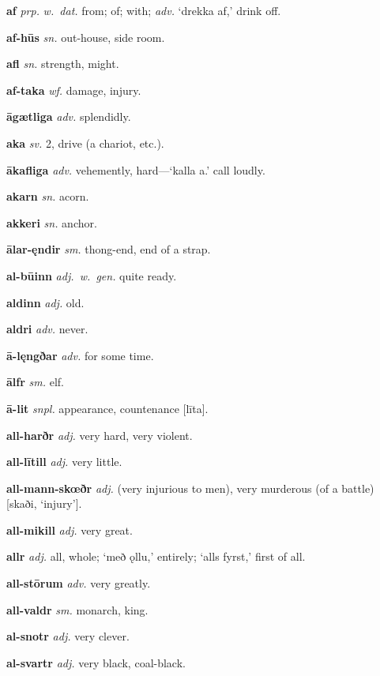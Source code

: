 \documentclass[12pt,letterpaper]{book}
\begin{document}
\noindent
\textbf{af} \textit{prp.} \textit{w.\ dat.} from; of; with; \textit{adv.} `drekka af,' drink off.

\noindent
\textbf{af-hūs} \textit{sn.} out-house, side room.

\noindent
\textbf{afl} \textit{sn.} strength, might.

\noindent
\textbf{af-taka} \textit{wf.} damage, injury.

\noindent
\textbf{āgætliga} \textit{adv.} splendidly.

\noindent
\textbf{aka} \textit{sv.} 2, drive (a chariot, etc.).

\noindent
\textbf{ākafliga} \textit{adv.} vehemently, hard---`kalla a.' call loudly.

\noindent
\textbf{akarn} \textit{sn.} acorn.

\noindent
\textbf{akkeri} \textit{sn.} anchor.

\noindent
\textbf{ālar-ęndir} \textit{sm.} thong-end, end of a strap.

\noindent
\textbf{al-būinn} \textit{adj.\ w.\ gen.} quite ready.

\noindent
\textbf{aldinn} \textit{adj.} old.

\noindent
\textbf{aldri} \textit{adv.} never.

\noindent
\textbf{ā-lęngðar} \textit{adv.} for some time.

\noindent
\textbf{ālfr} \textit{sm.} elf.

\noindent
\textbf{ā-lit} \textit{snpl.} appearance, countenance [līta].

\noindent
\textbf{all-harðr} \textit{adj.} very hard, very violent.

\noindent
\textbf{all-lītill} \textit{adj.} very little.

\noindent
\textbf{all-mann-skœðr} \textit{adj.} (very injurious to men), very murderous
    (of a battle) [skaði, `injury'].

\noindent
\textbf{all-mikill} \textit{adj.} very great.

\noindent
\textbf{allr} \textit{adj.} all, whole; `með ǫllu,' entirely; `alls fyrst,'
    first of all.

\noindent
\textbf{all-stōrum} \textit{adv.} very greatly.

\noindent
\textbf{all-valdr} \textit{sm.} monarch, king.

\noindent
\textbf{al-snotr} \textit{adj.} very clever.

\noindent
\textbf{al-svartr} \textit{adj.} very black, coal-black.
\end{document}
